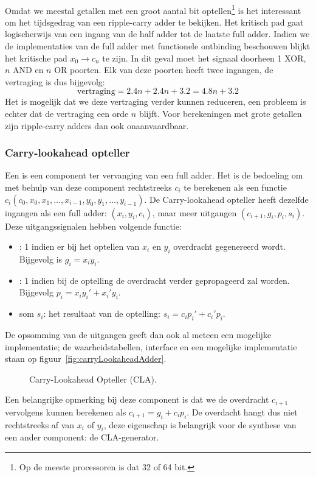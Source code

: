 \paragraph{}
Omdat we meestal getallen met een groot aantal bit optellen\footnote{Op de meeste processoren is dat 32 of 64 bit.} is het interessant om het tijdsgedrag van een ripple-carry adder te bekijken. Het kritisch pad gaat logischerwijs van een ingang van de half adder tot de laatste full adder. Indien we de implementaties van de full adder met functionele ontbinding beschouwen blijkt het kritische pad $x_0\rightarrow c_n$ te zijn. In dit geval moet het signaal doorheen 1 XOR, $n$ AND en $n$ OR poorten. Elk van deze poorten heeft twee ingangen, de vertraging is dus bijgevolg:
\begin{equation}
\mbox{vertraging}=2.4n+2.4n+3.2=4.8n+3.2
\end{equation}
Het is mogelijk dat we deze vertraging verder kunnen reduceren, een probleem is echter dat de vertraging een orde $n$ blijft. Voor berekeningen met grote getallen zijn ripple-carry adders dan ook onaanvaardbaar.
\subsubsection{Carry-lookahead opteller}
Een  is een component ter vervanging van een full adder. Het is de bedoeling om met behulp van deze component rechtstreeks $c_i$ te berekenen als een functie $c_i\left(c_0,x_0,x_1,\ldots,x_{i-1},y_0,y_1,\ldots,y_{i-1}\right)$. De Carry-lookahead opteller heeft dezelfde ingangen als een full adder: $(x_i,y_i,c_i)$, maar meer uitgangen $(c_{i+1},g_i,p_i,s_i)$. Deze uitgangssignalen hebben volgende functie:
\begin{itemize}
 \item {}: 1 indien er bij het optellen van $x_i$ en $y_i$ overdracht gegenereerd wordt. Bijgevolg is $g_i=x_iy_i$.
 \item {}: 1 indien bij de optelling de overdracht verder gepropageerd zal worden. Bijgevolg $p_i=x_iy_i'+x_i'y_i$.
 \item som $s_i$: het resultaat van de optelling: $s_i=c_ip_i'+c_i'p_i$.
\end{itemize}
De opsomming van de uitgangen geeft dan ook al meteen een mogelijke implementatie; de waarheidstabellen, interface en een mogelijke implementatie staan op figuur~\ref{fig:carryLookaheadAdder}.
\begin{figure}[hbt]
\centering
{}
\caption{Carry-Lookahead Opteller (CLA).}
\end{figure}
Een belangrijke opmerking bij deze component is dat we de overdracht $c_{i+1}$ vervolgens kunnen berekenen als $c_{i+1}=g_i+c_ip_i$. De overdacht hangt dus niet rechtstreeks af van $x_i$ of $y_i$, deze eigenschap is belangrijk voor de synthese van een ander component: de CLA-generator.
